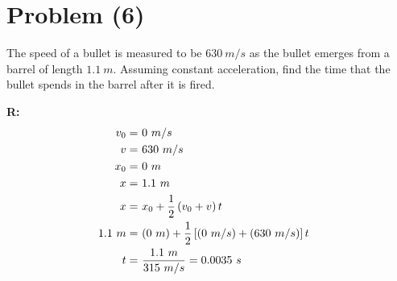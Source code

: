 \section{Problem (6)}
	The speed of a bullet is measured to be $630 \ m/s$ as the bullet emerges from a barrel of length $1.1 \ m$. Assuming constant acceleration, find the time that the bullet spends in the barrel after it is fired.

	\textbf{R:} \newline
	\begin{align}
		v_{0} = \ &0 \ m/s& \notag \\
		v = \ &630 \ m/s& \notag \\
		x_{0} = \ &0 \ m& \notag \\
		x = \ &1.1 \ m& \notag \\
		x = \ &x_{0} + \frac{1}{2} \left( v_{0} + v \right)t& \notag \\
		1.1 \ m = \ &(0 \ m) + \frac{1}{2} \left[ (0 \ m/s) + (630 \ m/s) \right] t& \notag \\
		t = \ &\frac{1.1 \ m}{315 \ m/s} = 0.0035 \ s&
	\end{align}
